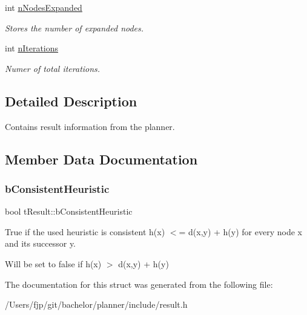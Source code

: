 \begin{DoxyCompactItemize}
\mbox{\label{structt_result_aeec87653572128a631adb83face701ee}} 
int \mbox{\hyperlink{structt_result_aeec87653572128a631adb83face701ee}{n\+Nodes\+Expanded}}
\begin{DoxyCompactList}\small\item\em Stores the number of expanded nodes. \end{DoxyCompactList}\item 
\mbox{\label{structt_result_ae43cdacfd85c009a19f17af62adf8729}} 
int \mbox{\hyperlink{structt_result_ae43cdacfd85c009a19f17af62adf8729}{n\+Iterations}}
\begin{DoxyCompactList}\small\item\em Numer of total iterations. \end{DoxyCompactList}\end{DoxyCompactItemize}


\subsection{Detailed Description}
Contains result information from the planner. 

\subsection{Member Data Documentation}
\mbox{\label{structt_result_a7d87aab6411a466aed07a27a70eeded2}} 
\subsubsection{\texorpdfstring{b\+Consistent\+Heuristic}{bConsistentHeuristic}}
{\footnotesize\ttfamily bool t\+Result\+::b\+Consistent\+Heuristic}



True if the used heuristic is consistent h(x) $<$= d(x,y) + h(y) for every node x and its successor y. 

Will be set to false if h(x) $>$ d(x,y) + h(y) 

The documentation for this struct was generated from the following file\+:\begin{DoxyCompactItemize}
\item 
/\+Users/fjp/git/bachelor/planner/include/result.\+h\end{DoxyCompactItemize}
